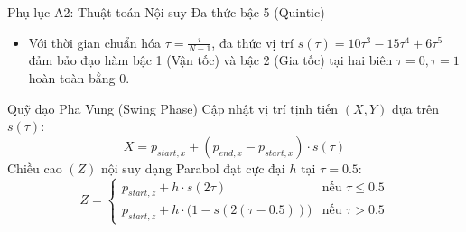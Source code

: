 \documentclass[10pt,aspectratio=169]{beamer}
\begin{document}
\begin{frame}{Phụ lục A2: Thuật toán Nội suy Đa thức bậc 5 (Quintic)}
  \begin{itemize}
      \item Với thời gian chuẩn hóa $\tau = \frac{i}{N-1}$, đa thức vị trí $s(\tau) = 10\tau^3 - 15\tau^4 + 6\tau^5$ đảm bảo đạo hàm bậc 1 (Vận tốc) và bậc 2 (Gia tốc) tại hai biên $\tau=0, \tau=1$ hoàn toàn bằng $0$.
  \end{itemize}
  \vspace{0.2cm}
  \begin{block}{Quỹ đạo Pha Vung (Swing Phase)}
      Cập nhật vị trí tịnh tiến $(X, Y)$ dựa trên $s(\tau)$:
      \begin{equation*}
          X = p_{start,x} + (p_{end,x} - p_{start,x}) \cdot s(\tau)
      \end{equation*}
      Chiều cao $(Z)$ nội suy dạng Parabol đạt cực đại $h$ tại $\tau = 0.5$:
      \begin{equation*}
          Z = \begin{cases}
          p_{start,z} + h \cdot s(2\tau) & \text{nếu } \tau \leq 0.5 \\
          p_{start,z} + h \cdot \big(1 - s(2(\tau - 0.5))\big) & \text{nếu } \tau > 0.5
          \end{cases}
      \end{equation*}
  \end{block}
\end{frame}
\end{document}
